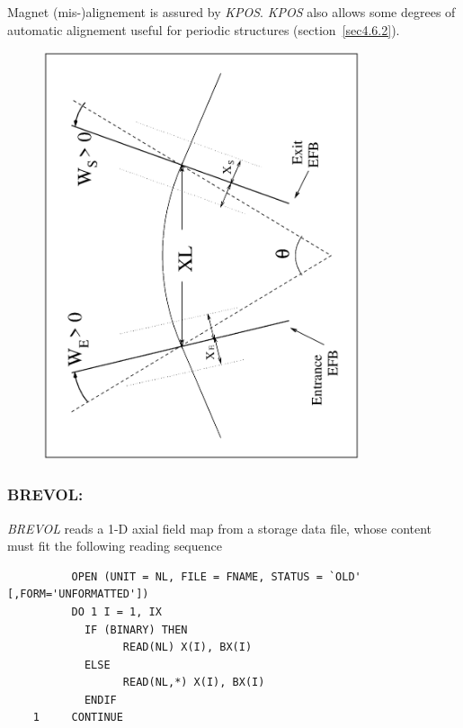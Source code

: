 \noindent Magnet (mis-)alignement is assured by \textsl{KPOS}. 
\textsl{KPOS} also  allows some degrees of automatic alignement useful for periodic structures (section~\ref{sec4.6.2}).

\vfill
\begin{figure}[H]
  \centerline{\includegraphics[height=12cm,angle=-90]{Fig14.eps}}
  {\setlength{\captionwidth}{12cm}
	\hangcaption[Fig14]{\label{fig14}
               \CapBEND
    } }
\end{figure}

\vfill
\newpage


\subsubsection*{BREVOL: \BREVOLTitl} \label{BREVOL}
\medskip

\textsl{BREVOL}  reads a 1-D axial field map from a storage data file,
whose content must fit the following \FORTRAN reading sequence   
\bigskip


{\footnotesize
\begin{verbatim}
	      OPEN (UNIT = NL, FILE = FNAME, STATUS = `OLD' [,FORM='UNFORMATTED'])
	      DO 1 I = 1, IX
	        IF (BINARY) THEN 
	              READ(NL) X(I), BX(I)
	        ELSE
	              READ(NL,*) X(I), BX(I)
	        ENDIF
	1     CONTINUE
\end{verbatim}}
\medskip

